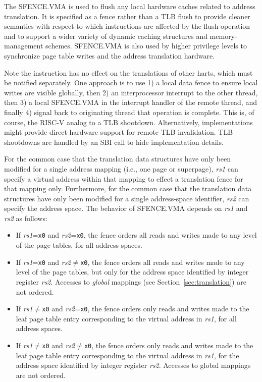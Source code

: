 \begin{commentary}
The SFENCE.VMA is used to flush any local hardware caches related to
address translation.  It is specified as a fence rather than a TLB
flush to provide cleaner semantics with respect to which instructions
are affected by the flush operation and to support a wider variety of
dynamic caching structures and memory-management schemes.  SFENCE.VMA
is also used by higher privilege levels to synchronize page table
writes and the address translation hardware.
\end{commentary}

\begin{commentary}
Note the instruction has no effect on the translations of other harts,
which must be notified separately.  One approach is to use 1)
a local data fence to ensure local writes are visible globally, then
2) an interprocessor interrupt to the other thread, then 3) a local
SFENCE.VMA in the interrupt handler of the remote thread, and finally
4) signal back to originating thread that operation is complete.  This
is, of course, the RISC-V analog to a TLB shootdown.  Alternatively,
implementations might provide direct hardware support for remote TLB
invalidation.  TLB shootdowns are handled by an SBI call to hide
implementation details.
\end{commentary}

For the common case that the translation data structures have only been
modified for a single address mapping (i.e., one page or superpage), {\em rs1}
can specify a virtual address within that mapping to effect a translation
fence for that mapping only.  Furthermore, for the common case that the
translation data structures have only been modified for a single address-space
identifier, {\em rs2} can specify the address space.  The behavior of
SFENCE.VMA depends on {\em rs1} and {\em rs2} as follows:

\begin{itemize}
\item If {\em rs1}={\tt x0} and {\em rs2}={\tt x0}, the fence orders all
      reads and writes made to any level of the page tables, for all
      address spaces.
\item If {\em rs1}={\tt x0} and {\em rs2}$\neq${\tt x0}, the fence orders
      all reads and writes made to any level of the page tables, but only
      for the address space identified by integer register {\em rs2}.
      Accesses to {\em global} mappings (see Section~\ref{sec:translation})
      are not ordered.
\item If {\em rs1}$\neq${\tt x0} and {\em rs2}={\tt x0}, the fence orders
      only reads and writes made to the leaf page table entry corresponding
      to the virtual address in {\em rs1}, for all address spaces.
\item If {\em rs1}$\neq${\tt x0} and {\em rs2}$\neq${\tt x0}, the fence
      orders only reads and writes made to the leaf page table entry
      corresponding to the virtual address in {\em rs1}, for the address
      space identified by integer register {\em rs2}.
      Accesses to global mappings are not ordered.
\end{itemize}

